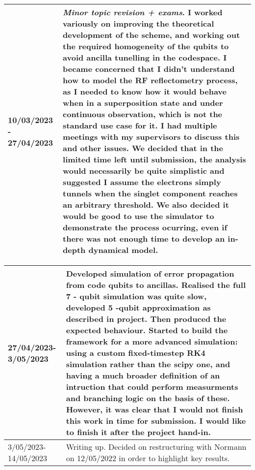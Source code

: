 \documentclass{article}
\begin{document}
\begin{table}
\begin{tabular}{|p{2cm}|p{10cm}|}
    \hline 10/03/2023 - 27/04/2023& \textit{Minor topic revision + exams}. I worked variously on improving the theoretical development of the scheme, and working out the required homogeneity of the qubits to avoid ancilla tunelling in the codespace. I became concerned that I didn't understand how to model the RF reflectometry process, as I needed to know how it would behave when in a superposition state and under continuous observation, which is not the standard use case for it. I had multiple meetings with my supervisors to discuss this and other issues. We decided that in the limited time left until submission, the analysis would necessarily be quite simplistic and suggested I assume the electrons simply tunnels when the singlet component reaches an arbitrary threshold. We also decided it would be good to use the simulator to demonstrate the process ocurring, even if there was not enough time to develop an in-depth dynamical model.\\
    \hline

\end{tabular}
\end{table}
\begin{table}
\centering
\begin{tabular}{|p{2cm}|p{10cm}|}

\hline 27/04/2023- 3/05/2023 & Developed simulation of error propagation from code qubits to ancillas. Realised the full 7 - qubit simulation was quite slow, developed 5 -qubit approximation as described in project. Then produced the expected behaviour. Started to build the framework for a more advanced simulation: using a custom fixed-timestep RK4 simulation rather than the scipy one, and having a much broader definition of an intruction that could perform measurments and branching logic on the basis of these. However, it was clear that I would not finish this work in time for submission. I would like to finish it after the project hand-in. \\

\hline 3/05/2023- 14/05/2023 & Writing up. Decided on restructuring with Normann on 12/05/2022 in order to highlight key results. \\
\hline

\end{tabular}
\end{table}
\end{document}
